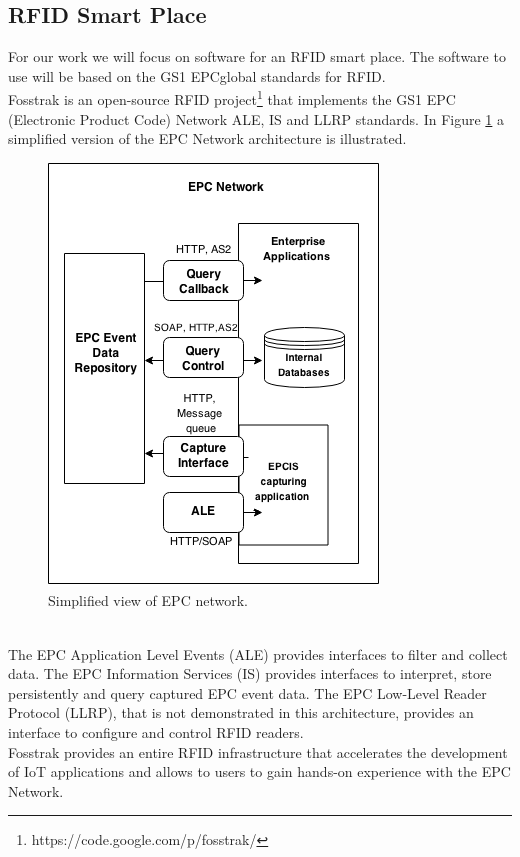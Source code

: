 \subsection{RFID Smart Place}
\label{sub:fosstrak}
For our work we will focus on software for an RFID smart place. The software to use
will be based on the GS1 EPCglobal standards for RFID.\\

Fosstrak is an open-source RFID project\footnote{https://code.google.com/p/fosstrak/}
that implements the GS1 EPC (Electronic Product Code) Network ALE, IS and LLRP standards.
In Figure \ref{fig:epc-architecture} a simplified version of the EPC Network architecture
is illustrated.
\begin{figure}
  \centering
  \includegraphics[scale=.7]{./images/epc-architecture}
  \caption{Simplified view of EPC network.}
  \label{fig:epc-architecture}
\end{figure}\\
The EPC Application Level Events (ALE) provides interfaces to filter and collect data.
The EPC Information Services (IS) provides interfaces to interpret, store persistently
and query captured EPC event data. The EPC Low-Level Reader Protocol (LLRP), that is not
demonstrated in this architecture, provides an interface to configure and control RFID
readers.\\

Fosstrak provides an entire RFID infrastructure that accelerates the development of
IoT applications and allows to users to gain hands-on experience with the EPC Network.
